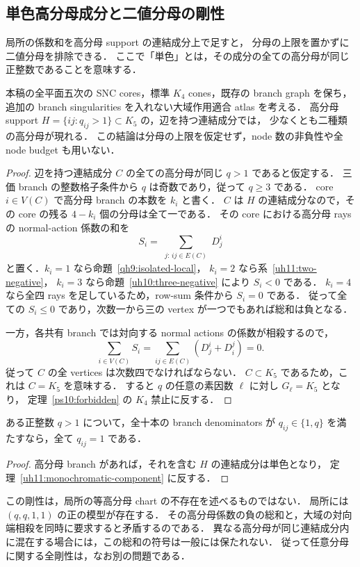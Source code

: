 \subsection{単色高分母成分と二値分母の剛性}
\label{uh11:monochromatic-section}

局所の係数和を高分母 support の連結成分上で足すと，
分母の上限を置かずに二値分母を排除できる．
ここで「単色」とは，その成分の全ての高分母が同じ正整数であることを意味する．

\begin{theorem}[単色高分母成分の不存在]\label{uh11:monochromatic-component}
本稿の全平面五次の SNC cores，標準 $K_4$ cones，既存の branch graph を保ち，
追加の branch singularities を入れない大域作用適合 atlas を考える．
高分母 support $H=\{ij:q_{ij}>1\}\subset K_5$ の，辺を持つ連結成分では，
少なくとも二種類の高分母が現れる．
この結論は分母の上限を仮定せず，node 数の非負性や全 node budget も用いない．
\end{theorem}

\begin{proof}
辺を持つ連結成分 $C$ の全ての高分母が同じ $q>1$ であると仮定する．
三価 branch の整数格子条件から $q$ は奇数であり，従って $q\geq3$ である．
core $i\in V(C)$ で高分母 branch の本数を $k_i$ と書く．
$C$ は $H$ の連結成分なので，その core の残る $4-k_i$ 個の分母は全て一である．
その core における高分母 rays の normal-action 係数の和を
\[
 S_i=\sum_{\substack{j:\,ij\in E(C)}}D^i_j
\]
と置く．$k_i=1$ なら命題~\ref{qh9:isolated-local}，
$k_i=2$ なら系~\ref{uh11:two-negative}，
$k_i=3$ なら命題~\ref{uh10:three-negative} により $S_i<0$ である．
$k_i=4$ なら全四 rays を足しているため，row-sum 条件から $S_i=0$ である．
従って全ての $S_i\leq0$ であり，次数一から三の vertex が一つでもあれば総和は負となる．

一方，各共有 branch では対向する normal actions の係数が相殺するので，
\[
 \sum_{i\in V(C)}S_i
 =\sum_{ij\in E(C)}(D^i_j+D^j_i)=0.
\]
従って $C$ の全 vertices は次数四でなければならない．
$C\subset K_5$ であるため，これは $C=K_5$ を意味する．
すると $q$ の任意の素因数 $\ell$ に対し $G_\ell=K_5$ となり，
定理~\ref{ps10:forbidden} の $K_4$ 禁止に反する．
\end{proof}

\begin{corollary}[二値分母の剛性]\label{uh11:two-value-rigidity}
ある正整数 $q>1$ について，全十本の branch denominators が
$q_{ij}\in\{1,q\}$ を満たすなら，全て $q_{ij}=1$ である．
\end{corollary}

\begin{proof}
高分母 branch があれば，それを含む $H$ の連結成分は単色となり，
定理~\ref{uh11:monochromatic-component} に反する．
\end{proof}

この剛性は，局所の等高分母 chart の不存在を述べるものではない．
局所には $(q,q,1,1)$ の正の模型が存在する．
その高分母係数の負の総和と，大域の対向端相殺を同時に要求すると矛盾するのである．
異なる高分母が同じ連結成分内に混在する場合には，この総和の符号は一般には保たれない．
従って任意分母に関する全剛性は，なお別の問題である．
